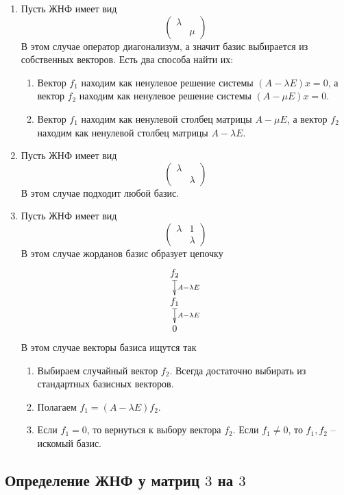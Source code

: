\documentclass{article}
\begin{document}
\begin{enumerate}
\item Пусть ЖНФ имеет вид
\[
\begin{pmatrix}
{\lambda}&{}\\
{}&{\mu}
\end{pmatrix}
\]
В этом случае оператор диагонализум, а значит базис выбирается из собственных векторов.
Есть два способа найти их:
\begin{enumerate}
\item Вектор $f_1$ находим как ненулевое решение системы $(A- \lambda E) x = 0$, а вектор $f_2$ находим как ненулевое решение системы $(A - \mu E) x = 0$.

\item Вектор $f_1$ находим как ненулевой столбец матрицы $A - \mu E$, а вектор $f_2$ находим как ненулевой столбец матрицы $A-\lambda E$.
\end{enumerate}

\item Пусть ЖНФ имеет вид
\[
\begin{pmatrix}
{\lambda}&{}\\
{}&{\lambda}
\end{pmatrix}
\]
В этом случае подходит любой базис.

\item Пусть ЖНФ имеет вид
\[
\begin{pmatrix}
{\lambda}&{1}\\
{}&{\lambda}
\end{pmatrix}
\]
В этом случае жорданов базис образует цепочку
\[
\xymatrix@R=15pt@C=15pt{
  {f_2}\ar@{|->}[d]^{A-\lambda E}\\
  {f_1}\ar@{|->}[d]^{A-\lambda E}\\
  {0}
}
\]
В этом случае векторы базиса ищутся так
\begin{enumerate}
\item Выбираем случайный вектор $f_2$.
Всегда достаточно выбирать из стандартных базисных векторов.

\item Полагаем $f_1 = (A - \lambda E) f_2$.

\item Если $f_1 = 0$, то вернуться к выбору вектора $f_2$.
Если $f_1 \neq 0$, то $f_1, f_2$ -- искомый базис.
\end{enumerate}
\end{enumerate}

\subsection{Определение ЖНФ у матриц $3$ на $3$}
\end{document}
